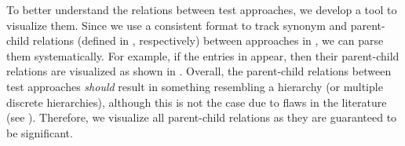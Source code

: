 To better understand the relations between test approaches, we develop a tool
to visualize them. \ifnotpaper%
    Since we use a consistent format to track synonym and parent-child
    relations (defined in , respectively)
    between approaches in \ourApproachGlossary{}, we can parse them
    systematically. For example, if the entries in 
    appear, then their parent-child relations are visualized as
    shown in . Overall, the parent-child relations
    between test approaches \emph{should} result in something resembling a
    hierarchy (or multiple discrete hierarchies), although this is not the case
    due to flaws in the literature (see ). Therefore, we
    visualize all parent-child relations as they are guaranteed to be
    significant.


